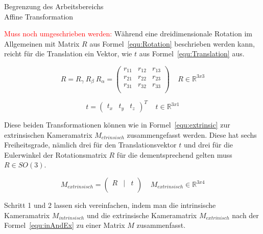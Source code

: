 \begin{description}
\item[Begrenzung des Arbeitsbereichs] %
\item[Affine Transformation] %
\end{description}


\textcolor{red}{Muss noch umgeschrieben werden: }
Während eine dreidimensionale Rotation im Allgemeinen mit Matrix $R$ aus Formel~\ref{equ:Rotation} beschrieben werden kann, reicht für die Translation ein Vektor, wie $t$ aus Formel~\ref{equ:Translation} aus.\

\begin{equation}
\label{equ:Rotation}
R= R_\gamma ~R_\beta ~R_\alpha =
\begin{pmatrix}
r_{11} & r_{12} & r_{13} \\
r_{21} & r_{22} & r_{23} \\
r_{31} & r_{32} & r_{33} \\
\end{pmatrix}
~ ~ ~ ~ ~R \in \mathbb{R}^{3x3}
\end{equation}



\begin{equation}
\label{equ:Translation}
t=
\begin{pmatrix}
t_x & t_y & t_z
\end{pmatrix}^T
~ ~ ~ ~ ~t \in \mathbb{R}^{3x1} 
\end{equation}

Diese beiden Transformationen können wie in Formel~\ref{equ:extrinsic} zur extrinsischen Kameramatrix $M_{etrinsisch}$ zusammengefasst werden. Diese hat sechs Freiheitsgrade, nämlich drei für den Translationsvektor $t$ und drei für die Eulerwinkel der Rotationsmatrix $R$ für die dementsprechend gelten muss $R \in SO(3)$.

\begin{equation}
\label{equ:extrinsic}
M_{extrinsisch}= 
\begin{pmatrix}
R &|& t \\
\end{pmatrix} 
~ ~ ~ ~ ~M_{extrinsisch} \in \mathbb{R}^{3x4}
\end{equation}

Schritt 1 und 2 lassen sich vereinfachen, indem man die intrinsische Kameramatrix $M_{intrinsisch}$ und die extrinsische Kameramatrix $M_{extrinisch}$ nach der Formel~\ref{equ:inAndEx} zu einer Matrix $M$ zusammenfasst.

